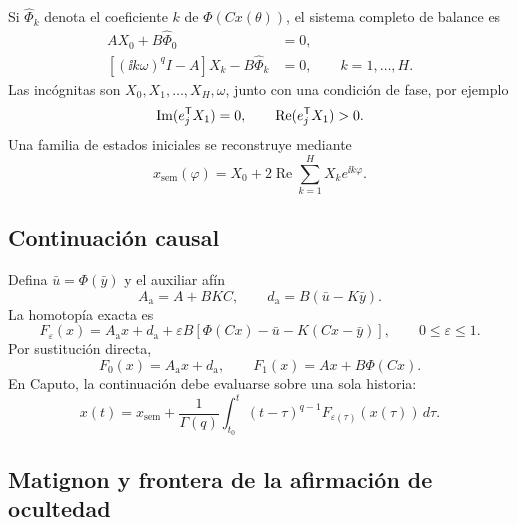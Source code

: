 Si \(\widehat\Phi_k\) denota el coeficiente \(k\) de \(\Phi(Cx(\theta))\), el
sistema completo de balance es
\begin{align}
 AX_0+B\widehat\Phi_0&=0,
 \label{nc:eq:hb0}\\
 \left[(\ii k\omega)^qI-A\right]X_k-B\widehat\Phi_k&=0,
 \qquad k=1,\ldots,H.
 \label{nc:eq:hbk}
\end{align}
Las incógnitas son \(X_0,X_1,\ldots,X_H,\omega\), junto con una condición de
fase, por ejemplo
\begin{equation}
 \operatorname{Im}(e_j^{\mathsf T} X_1)=0,\qquad
 \operatorname{Re}(e_j^{\mathsf T} X_1)>0.
 \label{nc:eq:phase-condition}
\end{equation}
Una familia de estados iniciales se reconstruye mediante
\begin{equation}
 x_{\mathrm{sem}}(\varphi)=X_0+
 2\operatorname{Re}\sum_{k=1}^{H}X_ke^{\ii k\varphi}.
 \label{nc:eq:seed-reconstruction}
\end{equation}

\subsection{Continuación causal}

Defina \(\bar u=\Phi(\bar y)\) y el auxiliar afín
\begin{equation}
 A_{\mathrm a}=A+BKC,\qquad
 d_{\mathrm a}=B(\bar u-K\bar y).
 \label{nc:eq:auxiliary}
\end{equation}
La homotopía exacta es
\begin{equation}
 F_\varepsilon(x)=A_{\mathrm a}x+d_{\mathrm a}
 +\varepsilon B\left[
 \Phi(Cx)-\bar u-K(Cx-\bar y)
 \right],\qquad 0\leq\varepsilon\leq1.
 \label{nc:eq:homotopy}
\end{equation}
Por sustitución directa,
\begin{equation}
 F_0(x)=A_{\mathrm a}x+d_{\mathrm a},
 \qquad F_1(x)=Ax+B\Phi(Cx).
\end{equation}
En Caputo, la continuación debe evaluarse sobre una sola historia:
\begin{equation}
 x(t)=x_{\mathrm{sem}}+
 \frac{1}{\Gamma(q)}\int_{t_0}^{t}
 (t-\tau)^{q-1}F_{\varepsilon(\tau)}(x(\tau))\,d\tau.
 \label{nc:eq:causal-homotopy}
\end{equation}

\subsection{Matignon y frontera de la afirmación de ocultedad}

